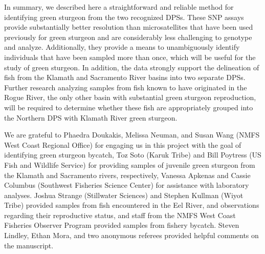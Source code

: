 In summary, we described here a straightforward and reliable method for identifying
green sturgeon from the two recognized DPSs. These SNP assays provide substantially 
better resolution than microsatellites that have been used previously for green sturgeon \citep{Israeletal2009} 
and are considerably less challenging to genotype and analyze. 
Additionally, they provide a means to unambiguously identify individuals that have been 
sampled more than once, which will be useful for the study of green sturgeon. In addition, 
the data strongly support the delineation of fish from the Klamath and Sacramento River 
basins into two separate DPSs. Further research analyzing samples from fish known to have 
originated in the Rogue River, the only other basin with substantial green sturgeon 
reproduction, will be required to determine whether these fish are appropriately 
grouped into the Northern DPS with Klamath River green sturgeon. 









\begin{acknowledgements}
We are grateful to Phaedra Doukakis, Melissa Neuman, and Susan Wang (NMFS West Coast Regional Office) for engaging us in this project with the goal of identifying green sturgeon bycatch, Toz Soto (Karuk Tribe) and Bill Poytress (US Fish and Wildlife Service) for providing samples of juvenile green sturgeon from the Klamath and Sacramento rivers, respectively, Vanessa Apkenas and Cassie Columbus (Southwest Fisheries Science Center) for assistance with laboratory analyses. Joshua Strange (Stillwater Sciences) and Stephen Kullman (Wiyot Tribe) provided samples from fish encountered in the Eel River, and observations regarding their reproductive status, and staff from the NMFS West Coast Fisheries Observer Program provided samples from fishery bycatch. Steven Lindley, Ethan Mora, and two anonymous referees provided helpful comments on the manuscript.
\end{acknowledgements}




